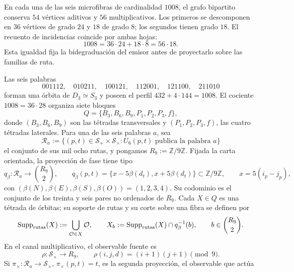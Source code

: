 En cada una de las seis microfibras de cardinalidad \(1008\), el grafo
bipartito conserva \(54\) vértices aditivos y \(56\) multiplicativos. Los
primeros se descomponen en \(36\) vértices de grado \(24\) y \(18\) de
grado \(8\); los segundos tienen grado \(18\). El recuento de incidencias
coincide por ambas hojas:
\begin{equation}
 1008=36\cdot24+18\cdot8=56\cdot18.
 \label{eq:bidegraduacion-microfibra-masas-autonoma}
\end{equation}
Esta igualdad fija la bidegraduación del emisor antes de proyectarlo sobre
las familias de ruta.

Las seis palabras
\begin{equation}
 001112,\quad010211,\quad100121,\quad112001,\quad121100,\quad211010
 \label{eq:seis-palabras-microfibra-masas-autonoma}
\end{equation}
forman una órbita de \(D_3\simeq S_3\) y poseen el perfil
\(432+4\cdot144=1008\). El cociente \(1008=36\cdot28\) organiza siete
bloques
\[
 Q=\{B_3,B_6,B_9,P_1,P_2,P_3,f\},
\]
donde \((B_3,B_6,B_9)\) son las tétradas transversales y
\((P_1,P_2,P_3,f)\), las cuatro tétradas laterales. Para una de las seis
palabras \(a\), sea
\[
 \mathcal R_a
 :=\{(p,t)\in\mathcal S_+\times\mathcal S_\times:
       U_6(p,t)\text{ publica la palabra }a\}
\]
el conjunto de sus mil ocho rutas, y pongamos
\(R_9:=\mathbb Z/9\mathbb Z\). Fijada la carta orientada, la proyección
de fase tiene tipo
\begin{equation}
 q_\beta:\mathcal R_a\longrightarrow\binom{R_9}{2},
 \qquad
 q_\beta(p,t)
 =\{x-5\beta(d_t),x+5\beta(d_t)\}\subset\mathbb Z/9\mathbb Z,
 \qquad x=5(i_p-j_p),
 \label{eq:proyeccion-fano-semillas-masas-autonoma}
\end{equation}
con \((\beta(N),\beta(E),\beta(S),\beta(O))=(1,2,3,4)\). Su codominio es
el conjunto de los treinta y seis pares no ordenados de \(R_9\). Cada
\(X\in Q\) es una tétrada de órbitas;
su soporte de rutas y su corte sobre una fibra se definen por
\[
 \operatorname{Supp}_{\rm rutas}(X)
 :=\bigcup_{\mathcal O\in X}\mathcal O,
 \qquad
 X_b:=\operatorname{Supp}_{\rm rutas}(X)\cap q_\beta^{-1}(b),
 \qquad b\in\binom{R_9}{2}.
\]
En el canal multiplicativo, el observable fuente es
\begin{equation}
 \rho:\mathcal S_\times\longrightarrow R_9,
 \qquad
 \rho(i,j,d)=(i+1)(j+1)\pmod9.
 \label{eq:residuo-producto-fano-semillas-rev3}
\end{equation}
Si \(\pi_\times:\mathcal R_a\to\mathcal S_\times\),
\(\pi_\times(p,t)=t\), es la segunda proyección, el observable que actúa
